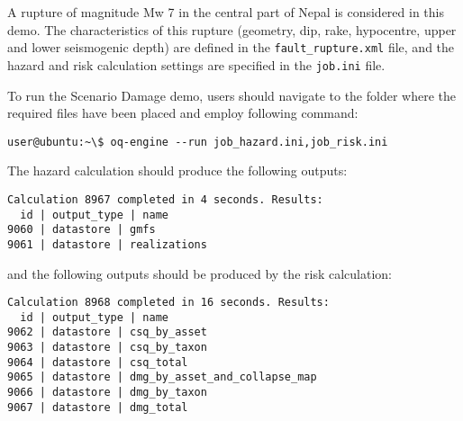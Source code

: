 A rupture of magnitude Mw 7 in the central part of Nepal is considered in this
demo. The characteristics of this rupture (geometry, dip, rake, hypocentre,
upper and lower seismogenic depth) are defined in the \verb+fault_rupture.xml+
file, and the hazard and risk calculation settings are specified in the
\verb+job.ini+ file.

To run the Scenario Damage demo, users should navigate to the folder where the
required files have been placed and employ following command:

\begin{verbatim}
user@ubuntu:~\$ oq-engine --run job_hazard.ini,job_risk.ini
\end{verbatim}

The hazard calculation should produce the following outputs:

\begin{verbatim}
Calculation 8967 completed in 4 seconds. Results:
  id | output_type | name
9060 | datastore | gmfs
9061 | datastore | realizations
\end{verbatim}

and the following outputs should be produced by the risk calculation:

\begin{verbatim}
Calculation 8968 completed in 16 seconds. Results:
  id | output_type | name
9062 | datastore | csq_by_asset
9063 | datastore | csq_by_taxon
9064 | datastore | csq_total
9065 | datastore | dmg_by_asset_and_collapse_map
9066 | datastore | dmg_by_taxon
9067 | datastore | dmg_total
\end{verbatim}
